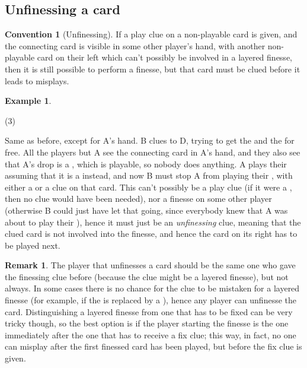 \documentclass[a4paper]{article}
\theoremstyle{plain}
\theoremstyle{definition}
\newtheorem{remark}[theorem]{Remark}
\newtheorem{example}[theorem]{Example}
\newtheorem{convention}[theorem]{Convention}
\begin{document}
\subsection{Unfinessing a card}

\begin{convention}[Unfinessing]
	\label{unfinessing}
	If a play clue on a non-playable card is given, and the connecting card is visible in some other player's hand, with another non-playable card on their left which can't possibly be involved in a layered finesse, then it is still possible to perform a finesse, but that card must be clued before it leads to misplays.
\end{convention}

\begin{example}
	\hfill
	\begin{tasks}(3)
		\task[+]      
		\task[A]    
		\task[B]    
		\task[C]     
		\task[D]    
		\task[E]    
	\end{tasks}
	
	Same as before, except for A's hand. B clues  to D, trying to get the  and the  for free. All the players but A see the connecting card in A's hand, and they also see that A's drop is a , which is playable, so nobody does anything. A plays their  assuming that it is a  instead, and now B must stop A from playing their , with either a  or a  clue on that card. This can't possibly be a play clue (if it were a , then no clue would have been needed), nor a finesse on some other player (otherwise B could just have let that going, since everybody knew that A was about to play their ), hence it must just be an \textit{unfinessing} clue, meaning that the clued card is not involved into the finesse, and hence the card on its right has to be played next.
\end{example}

\begin{remark}
	The player that unfinesses a card should be the same one who gave the finessing clue before (because the clue might be a layered finesse), but not always. In some cases there is no chance for the clue to be mistaken for a layered finesse (for example, if the  is replaced by a ), hence any player can unfinesse the card. Distinguishing a layered finesse from one that has to be fixed can be very tricky though, so the best option is if the player starting the finesse is the one immediately after the one that has to receive a fix clue; this way, in fact, no one can misplay after the first finessed card has been played, but before the fix clue is given.
\end{remark}
\end{document}
